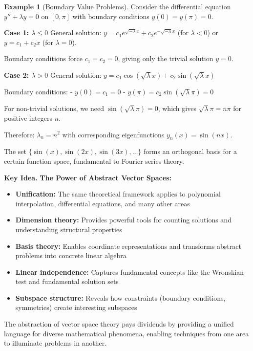 \documentclass[12pt]{article}
\numberwithin{equation}{section}
\theoremstyle{plain}
\theoremstyle{definition}
\newtheorem{example}[theorem]{Example}
\theoremstyle{remark}
\newenvironment{keyidea}{\begin{tcolorbox}\textbf{Key Idea.}}{\end{tcolorbox}}
\begin{document}
\begin{example}[Boundary Value Problems]
Consider the differential equation $y'' + \lambda y = 0$ on $[0, \pi]$ with boundary conditions $y(0) = y(\pi) = 0$.

\textbf{Case 1: $\lambda \leq 0$}
General solution: $y = c_1e^{\sqrt{-\lambda}x} + c_2e^{-\sqrt{-\lambda}x}$ (for $\lambda < 0$) or $y = c_1 + c_2x$ (for $\lambda = 0$).

Boundary conditions force $c_1 = c_2 = 0$, giving only the trivial solution $y = 0$.

\textbf{Case 2: $\lambda > 0$}
General solution: $y = c_1\cos(\sqrt{\lambda}x) + c_2\sin(\sqrt{\lambda}x)$

Boundary conditions:
- $y(0) = c_1 = 0$
- $y(\pi) = c_2\sin(\sqrt{\lambda}\pi) = 0$

For non-trivial solutions, we need $\sin(\sqrt{\lambda}\pi) = 0$, which gives $\sqrt{\lambda}\pi = n\pi$ for positive integers $n$.

Therefore: $\lambda_n = n^2$ with corresponding eigenfunctions $y_n(x) = \sin(nx)$.

The set $\{\sin(x), \sin(2x), \sin(3x), \ldots\}$ forms an orthogonal basis for a certain function space, fundamental to Fourier series theory.
\end{example}

\begin{keyidea}
\textbf{The Power of Abstract Vector Spaces:}
\begin{itemize}
\item \textbf{Unification:} The same theoretical framework applies to polynomial interpolation, differential equations, and many other areas
\item \textbf{Dimension theory:} Provides powerful tools for counting solutions and understanding structural properties
\item \textbf{Basis theory:} Enables coordinate representations and transforms abstract problems into concrete linear algebra
\item \textbf{Linear independence:} Captures fundamental concepts like the Wronskian test and fundamental solution sets
\item \textbf{Subspace structure:} Reveals how constraints (boundary conditions, symmetries) create interesting subspaces
\end{itemize}

The abstraction of vector space theory pays dividends by providing a unified language for diverse mathematical phenomena, enabling techniques from one area to illuminate problems in another.
\end{keyidea}
\end{document}
